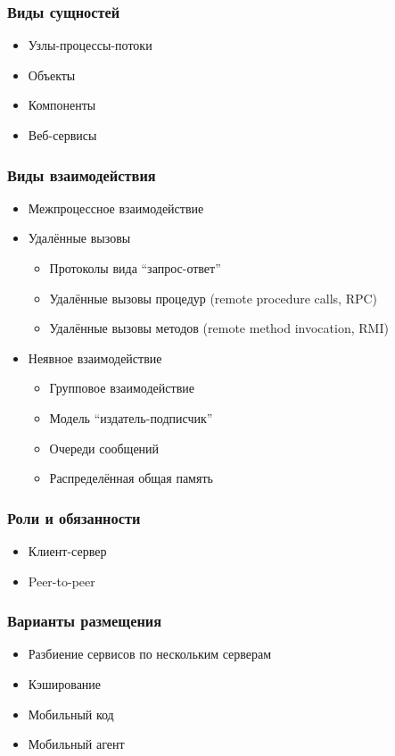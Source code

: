 \documentclass[xetex,mathserif,serif]{beamer}
\begin{document}
	\begin{frame}
		\frametitle{Виды сущностей}
		\begin{itemize}
			\item Узлы-процессы-потоки
			\item Объекты
			\item Компоненты
			\item Веб-сервисы
		\end{itemize}
	\end{frame}

	\begin{frame}
		\frametitle{Виды взаимодействия}
		\begin{itemize}
			\item Межпроцессное взаимодействие
			\item Удалённые вызовы
			\begin{itemize}
				\item Протоколы вида ``запрос-ответ''
				\item Удалённые вызовы процедур (remote procedure calls, RPC)
				\item Удалённые вызовы методов (remote method invocation, RMI)
			\end{itemize}
			\item Неявное взаимодействие
			\begin{itemize}
				\item Групповое взаимодействие
				\item Модель “издатель-подписчик”
				\item Очереди сообщений
				\item Распределённая общая память
			\end{itemize}
		\end{itemize}
	\end{frame}

	\begin{frame}
		\frametitle{Роли и обязанности}
		\begin{itemize}
			\item Клиент-сервер
			\item Peer-to-peer
		\end{itemize}
	\end{frame}

	\begin{frame}
		\frametitle{Варианты размещения}
		\begin{itemize}
			\item Разбиение сервисов по нескольким серверам
			\item Кэширование
			\item Мобильный код
			\item Мобильный агент
		\end{itemize}
	\end{frame}
\end{document}
